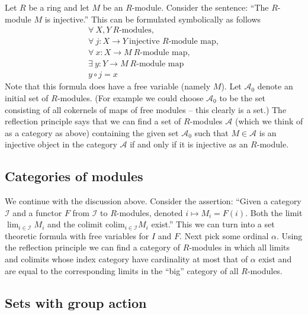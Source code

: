 \noindent
Let $R$ be a ring and let $M$ be an $R$-module.
Consider the sentence: ``The $R$-module $M$ is injective.''
This can be formulated symbolically as follows
\begin{eqnarray*}
\forall\ X,Y\ \text{$R$-modules},\\
\forall\ j : X\to Y\ \text{injective $R$-module map},\\
\forall\ x : X\to M\ \text{$R$-module map},\\
\exists\ y : Y\to M\ \text{$R$-module map}\\
y \circ j = x
\end{eqnarray*}
Note that this formula does have a free variable (namely $M$).
Let $\mathcal{A}_0$ denote an initial set of $R$-modules.
(For example we could choose $\mathcal{A}_0$ to be the set
consisting of all cokernels of maps of free modules -- this
clearly is a set.)
The reflection principle says that we can find a set
of $R$-modules $\mathcal{A}$ (which we think of as a category
as above) containing the given set $\mathcal{A}_0$
such that $M \in \mathcal{A}$ is an injective
object in the category $\mathcal{A}$ if and only if
it is injective as an $R$-module. 

\subsection{Categories of modules}

\noindent
We continue with the discussion above.
Consider the assertion: ``Given a category $\mathcal{I}$
and a functor $F$ from $\mathcal{I}$ to $R$-modules,
denoted $i \mapsto M_i = F(i)$. Both the limit $\lim_{i\in \mathcal{I}} M_i$
and the colimit $\text{colim}_{i \in \mathcal{I}} M_i$ exist.'' 
This we can turn into a set theoretic formula with free
variables for $I$ and $F$. Next pick some ordinal $\alpha$.
Using the reflection principle
we can find a category of $R$-modules
in which all limits and colimits whose index category 
have cardinality at most that of $\alpha$ exist and
are equal to the corresponding limits in the ``big''
category of all $R$-modules.

\subsection{Sets with group action}
\label{subsection-sets-with-group-action}

